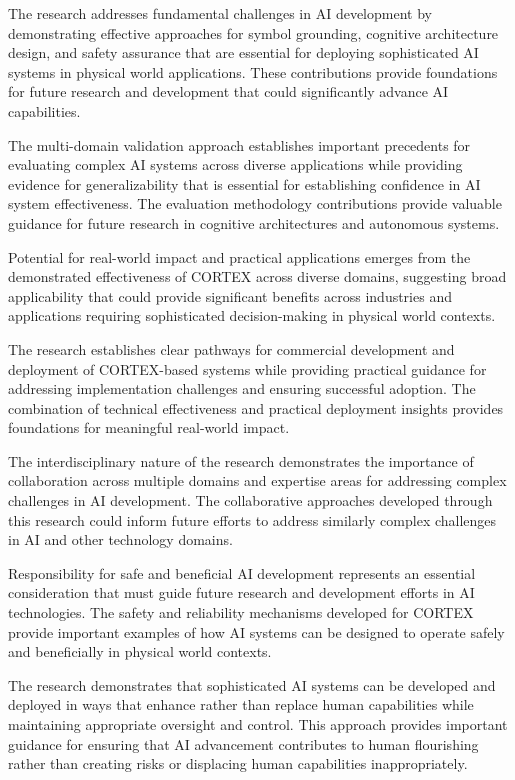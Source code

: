 The research addresses fundamental challenges in AI development by demonstrating effective approaches for symbol grounding, cognitive architecture design, and safety assurance that are essential for deploying sophisticated AI systems in physical world applications. These contributions provide foundations for future research and development that could significantly advance AI capabilities.

The multi-domain validation approach establishes important precedents for evaluating complex AI systems across diverse applications while providing evidence for generalizability that is essential for establishing confidence in AI system effectiveness. The evaluation methodology contributions provide valuable guidance for future research in cognitive architectures and autonomous systems.

Potential for real-world impact and practical applications emerges from the demonstrated effectiveness of CORTEX across diverse domains, suggesting broad applicability that could provide significant benefits across industries and applications requiring sophisticated decision-making in physical world contexts.

The research establishes clear pathways for commercial development and deployment of CORTEX-based systems while providing practical guidance for addressing implementation challenges and ensuring successful adoption. The combination of technical effectiveness and practical deployment insights provides foundations for meaningful real-world impact.

The interdisciplinary nature of the research demonstrates the importance of collaboration across multiple domains and expertise areas for addressing complex challenges in AI development. The collaborative approaches developed through this research could inform future efforts to address similarly complex challenges in AI and other technology domains.

Responsibility for safe and beneficial AI development represents an essential consideration that must guide future research and development efforts in AI technologies. The safety and reliability mechanisms developed for CORTEX provide important examples of how AI systems can be designed to operate safely and beneficially in physical world contexts.

The research demonstrates that sophisticated AI systems can be developed and deployed in ways that enhance rather than replace human capabilities while maintaining appropriate oversight and control. This approach provides important guidance for ensuring that AI advancement contributes to human flourishing rather than creating risks or displacing human capabilities inappropriately.

